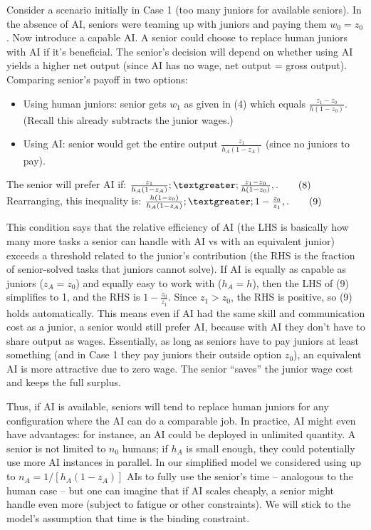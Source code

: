\documentclass[12pt]{article}
\begin{document}
Consider a scenario initially in Case 1 (too many juniors for available
seniors). In the {absence of AI}, seniors were teaming up with
juniors and paying them \(w_0 = z_0\). Now introduce a capable AI. A
senior could choose to {replace human juniors with AI} if it's
beneficial. The senior's decision will depend on whether using AI yields
a higher net output (since AI has no wage, net output = gross output).
Comparing senior's payoff in two options:

\begin{itemize}

\item
  Using human juniors: senior gets \(w_1\) as given in (4) which equals
  \(\frac{z_1 - z_0}{h(1-z_0)}\). (Recall this already subtracts the
  junior wages.)
\item
  Using AI: senior would get the entire output
  \(\frac{z_1}{h_A(1-z_A)}\) (since no juniors to pay).
\end{itemize}

The senior will prefer AI if: $ \frac{z_1}{h_A(1-z_A)}
;\textgreater; \frac{z_1 - z_0}{h(1-z_0)},. \tag{8}$ Rearranging,
this inequality is: $ \frac{h(1-z_0)}{h_A(1-z_A)} ;\textgreater; 1
- \frac{z_0}{z_1},. \tag{9}$

This condition says that the {relative efficiency} of AI (the LHS
is basically how many more tasks a senior can handle with AI vs with an
equivalent junior) exceeds a threshold related to the junior's
contribution (the RHS is the fraction of senior-solved tasks that
juniors cannot solve). If AI is equally as capable as juniors
(\(z_A = z_0\)) and equally easy to work with (\(h_A = h\)), then the
LHS of (9) simplifies to 1, and the RHS is \(1 - \frac{z_0}{z_1}\).
Since \(z_1 > z_0\), the RHS is positive, so (9) holds automatically.
This means {even if AI had the same skill and communication cost as
a junior, a senior would still prefer AI}, because with AI they don't
have to share output as wages. Essentially, as long as seniors have to
pay juniors at least something (and in Case 1 they pay juniors their
outside option \(z_0\)), an equivalent AI is more attractive due to zero
wage. The senior ``saves'' the junior wage cost and keeps the full
surplus.

Thus, {if AI is available, seniors will tend to replace human
juniors} for any configuration where the AI can do a comparable job. In
practice, AI might even have advantages: for instance, an AI could be
deployed in {unlimited quantity}. A senior is not limited to
\(n_0\) humans; if \(h_A\) is small enough, they could potentially use
more AI instances in parallel. In our simplified model we considered
using up to \(n_A = 1/[h_A(1-z_A)]\) AIs to fully use the senior's time
-- analogous to the human case -- but one can imagine that if AI scales
cheaply, a senior might handle even more (subject to fatigue or other
constraints). We will stick to the model's assumption that time is the
binding constraint.
\end{document}
